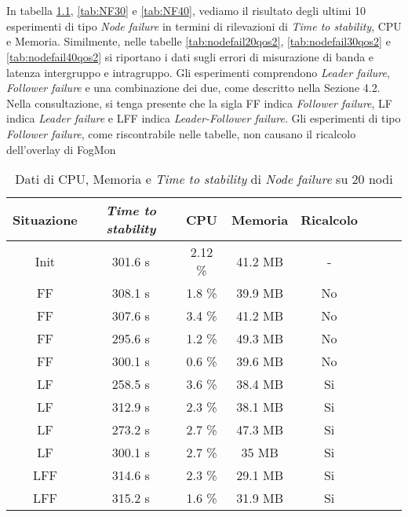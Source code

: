 \chapter{}
\label{AppA}
    In tabella \ref{tab:NF20}, \ref{tab:NF30} e \ref{tab:NF40}, vediamo il risultato degli ultimi 10 esperimenti di tipo \textit{Node failure} in termini di rilevazioni di \textit{Time to stability}, CPU e Memoria. Similmente, nelle tabelle \ref{tab:nodefail20qos2}, \ref{tab:nodefail30qos2} e \ref{tab:nodefail40qos2} si riportano i dati sugli errori di misurazione di banda e latenza intergruppo e intragruppo. Gli esperimenti comprendono \textit{Leader failure}, \textit{Follower failure} e una combinazione dei due, come descritto nella Sezione 4.2. Nella consultazione, si tenga presente che la sigla FF indica \textit{Follower failure}, LF indica \textit{Leader failure} e LFF indica \textit{Leader-Follower failure}.
    Gli esperimenti di tipo \textit{Follower failure}, come riscontrabile nelle tabelle, non causano il ricalcolo dell'overlay di FogMon
    \begin{table}[H]
    \caption{Dati di CPU, Memoria e \textit{Time to stability} di \textit{Node failure} su 20 nodi}
    \label{tab:NF20}
    \begin{center}
        \begin{tabular}{|c|c|c|c|c|c|c|c|}
            \hline
            Situazione & \textit{Time to stability} & CPU & Memoria & Ricalcolo\\
            \hline
            Init & 301.6 s & 2.12 \% & 41.2 MB & -\\
            FF    & 308.1 s  & 1.8 \%  & 39.9 MB & No\\
            FF    & 307.6 s  & 3.4 \%  & 41.2  MB & No\\
            FF    & 295.6 s  & 1.2 \%  & 49.3  MB & No\\
            FF    & 300.1 s  & 0.6 \%  & 39.6  MB & No\\
            LF    & 258.5 s  & 3.6 \%  & 38.4  MB & Si\\
            LF    & 312.9 s  & 2.3 \%  & 38.1  MB & Si\\
            LF    & 273.2 s  & 2.7 \%  & 47.3  MB & Si\\
            LF    & 300.1 s  & 2.7 \%  & 35    MB & Si\\
            LFF   & 314.6 s  & 2.3 \%  & 29.1  MB & Si\\
            LFF   & 315.2 s  & 1.6 \%  & 31.9  MB & Si\\
            \hline
        \end{tabular}
        \end{center}
    \end{table}
    
